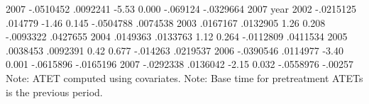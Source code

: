        2007  {\VBAR}  -.0510452   .0092241    -5.53   0.000     -.069124   -.0329664
2007         {\VBAR}
        year {\VBAR}
       2002  {\VBAR}  -.0215125    .014779    -1.46   0.145    -.0504788    .0074538
       2003  {\VBAR}   .0167167   .0132905     1.26   0.208    -.0093322    .0427655
       2004  {\VBAR}   .0149363   .0133763     1.12   0.264    -.0112809    .0411534
       2005  {\VBAR}   .0038453   .0092391     0.42   0.677     -.014263    .0219537
       2006  {\VBAR}  -.0390546   .0114977    -3.40   0.001    -.0615896   -.0165196
       2007  {\VBAR}  -.0292338   .0136042    -2.15   0.032    -.0558976     -.00257
Note: ATET computed using covariates.
Note: Base time for pretreatment ATETs is the previous period.
